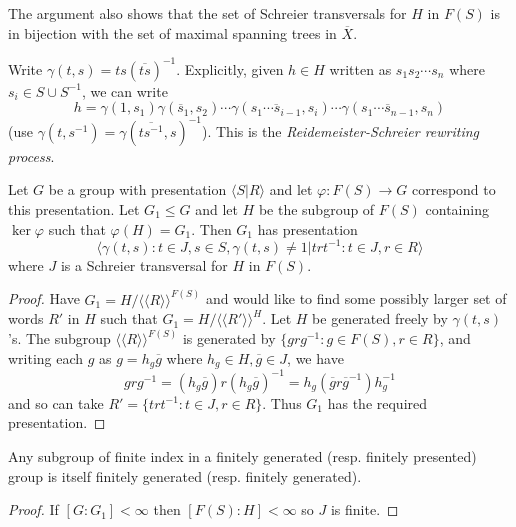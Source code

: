 \documentclass[a4paper]{article}
\begin{document}
\begin{remark}
  The argument also shows that the set of Schreier transversals for \(H\) in \(F(S)\) is in bijection with the set of maximal spanning trees in \(\overline X\).
\end{remark}

Write \(\gamma(t, s) = ts(\overline{ts})^{-1}\). Explicitly, given \(h \in H\) written as \(s_1s_2 \cdots s_n\) where \(s_i \in S \cup S^{-1}\), we can write
\[
  h = \gamma(1, s_1) \gamma(\overline s_1, s_2) \cdots \gamma(\overline{s_1 \cdots s_{i - 1}}, s_i) \cdots \gamma(\overline{s_1 \cdots s_{n - 1}}, s_n)
\]
(use \(\gamma(t, s^{-1}) = \gamma(\overline{ts^{-1}}, s)^{-1}\)).
This is the \emph{Reidemeister-Schreier rewriting process}.

\begin{theorem}
  Let \(G\) be a group with presentation \(\langle S| R\rangle\) and let \(\varphi: F(S) \to G\) correspond to this presentation. Let \(G_1 \leq G\) and let \(H\) be the subgroup of \(F(S)\) containing \(\ker \varphi\) such that \(\varphi(H) = G_1\). Then \(G_1\) has presentation
  \[
    \langle \gamma(t, s): t \in J, s \in S, \gamma(t, s) \ne 1| trt^{-1}: t \in J, r \in R \rangle
  \]
  where \(J\) is a Schreier transversal for \(H\) in \(F(S)\).
\end{theorem}

\begin{proof}
  Have \(G_1 = H/\langle\langle R\rangle\rangle^{F(S)}\) and would like to find some possibly larger set of words \(R'\) in \(H\) such that \(G_1 = H/\langle\langle R' \rangle\rangle^H\). Let \(H\) be generated freely by \(\gamma(t, s)\)'s. The subgroup \(\langle\langle R\rangle\rangle^{F(S)}\) is generated by \(\{grg^{-1}: g \in F(S), r \in R\}\), and writing each \(g\) as \(g = h_g \overline g\) where \(h_g \in H, \overline g \in J\), we have
  \[
    grg^{-1}
    = (h_g \overline g) r (h_g \overline g)^{-1}
    = h_g (\overline g r \overline g^{-1}) h_g^{-1}
  \]
  and so can take \(R' = \{trt^{-1}: t \in J, r \in R\}\). Thus \(G_1\) has the required presentation.
\end{proof}

\begin{corollary}
  Any subgroup of finite index in a finitely generated (resp. finitely presented) group is itself finitely generated (resp. finitely generated).
\end{corollary}

\begin{proof}
  If \([G: G_1] < \infty\) then \([F(S): H] < \infty\) so \(J\) is finite.
\end{proof}
\end{document}

